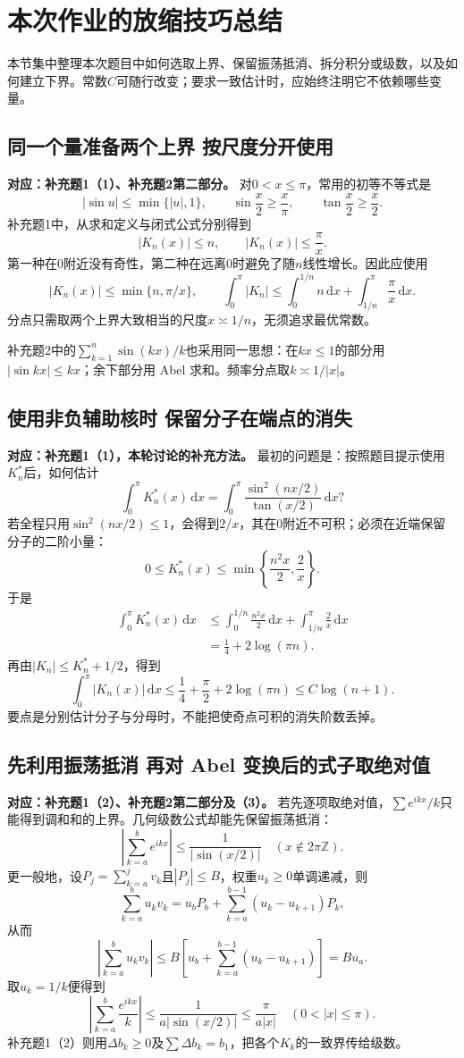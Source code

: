 \documentclass[11pt,a4paper]{ctexart}
\newcommand{\dd}{\,\mathrm d}
\begin{document}
\section{本次作业的放缩技巧总结}
\label{sec:estimates}
本节集中整理本次题目中如何选取上界、保留振荡抵消、拆分积分或级数，以及如何建立下界。常数$C$可随行改变；要求一致估计时，应始终注明它不依赖哪些变量。

\subsection{同一个量准备两个上界 按尺度分开使用}
\noindent\textbf{对应：补充题1（1）、补充题2第二部分。}
对$0<x\le\pi$，常用的初等不等式是
\[
 |\sin u|\le\min\{|u|,1\},\qquad
 \sin\frac x2\ge\frac x\pi,\qquad
 \tan\frac x2\ge\frac x2.
\]
补充题1中，从求和定义与闭式公式分别得到
\[
 |K_n(x)|\le n,\qquad |K_n(x)|\le\frac\pi x.
\]
第一种在$0$附近没有奇性，第二种在远离$0$时避免了随$n$线性增长。因此应使用
\[
 |K_n(x)|\le\min\{n,\pi/x\},
 \qquad
 \int_0^\pi|K_n|\le\int_0^{1/n}n\dd x+\int_{1/n}^\pi\frac\pi x\dd x.
\]
分点只需取两个上界大致相当的尺度$x\asymp1/n$，无须追求最优常数。

补充题2中的$\sum_{k=1}^n\sin(kx)/k$也采用同一思想：在$kx\le1$的部分用$|\sin kx|\le kx$；余下部分用 Abel 求和。频率分点取$k\asymp1/|x|$。

\subsection{使用非负辅助核时 保留分子在端点的消失}
\noindent\textbf{对应：补充题1（1），本轮讨论的补充方法。}
最初的问题是：按照题目提示使用$K_n^*$后，如何估计
\[
 \int_0^\pi K_n^*(x)\dd x
 =\int_0^\pi\frac{\sin^2(nx/2)}{\tan(x/2)}\dd x?
\]
若全程只用$\sin^2(nx/2)\le1$，会得到$2/x$，其在$0$附近不可积；必须在近端保留分子的二阶小量：
\[
 0\le K_n^*(x)
 \le\min\left\{\frac{n^2x}{2},\frac2x\right\}.
\]
于是
\begin{align*}
 \int_0^\pi K_n^*(x)\dd x
 &\le\int_0^{1/n}\frac{n^2x}{2}\dd x
    +\int_{1/n}^\pi\frac2x\dd x\\
 &=\frac14+2\log(\pi n).
\end{align*}
再由$|K_n|\le K_n^*+1/2$，得到
\[
 \int_0^\pi|K_n(x)|\dd x
 \le\frac14+\frac\pi2+2\log(\pi n)
 \le C\log(n+1).
\]
要点是分别估计分子与分母时，不能把使奇点可积的消失阶数丢掉。

\subsection{先利用振荡抵消 再对 Abel 变换后的式子取绝对值}
\noindent\textbf{对应：补充题1（2）、补充题2第二部分及（3）。}
若先逐项取绝对值，$\sum e^{ikx}/k$只能得到调和和的上界。几何级数公式却能先保留振荡抵消：
\[
 \left|\sum_{k=a}^b e^{ikx}\right|
 \le\frac1{|\sin(x/2)|}\quad(x\notin2\pi\mathbb Z).
\]
更一般地，设$P_j=\sum_{k=a}^jv_k$且$|P_j|\le B$，权重$u_k\ge0$单调递减，则
\[
 \sum_{k=a}^bu_kv_k
 =u_bP_b+\sum_{k=a}^{b-1}(u_k-u_{k+1})P_k,
\]
从而
\[
 \left|\sum_{k=a}^bu_kv_k\right|
 \le B\left[u_b+\sum_{k=a}^{b-1}(u_k-u_{k+1})\right]
 =Bu_a.
\]
取$u_k=1/k$便得到
\[
 \left|\sum_{k=a}^b\frac{e^{ikx}}k\right|
 \le\frac1{a|\sin(x/2)|}\le\frac\pi{a|x|}
 \quad(0<|x|\le\pi).
\]
补充题1（2）则用$\Delta b_k\ge0$及$\sum\Delta b_k=b_1$，把各个$K_k$的一致界传给级数。
\end{document}
